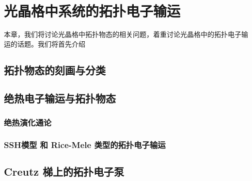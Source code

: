\chapter{光晶格中系统的拓扑电子输运}

本章，我们将讨论光晶格中拓扑物态的相关问题，着重讨论光晶格中的拓扑电子输运的话题。我们将首先介绍


\section{拓扑物态的刻画与分类}






\section{绝热电子输运与拓扑物态}\label{sec:topocp}

\subsection{绝热演化通论}\label{sec:adiabatic}



\subsection{SSH模型 和 Rice-Mele 类型的拓扑电子输运}\label{sec:ssh}




\section{ Creutz 梯上的拓扑电子泵}\label{sec:creutz}

